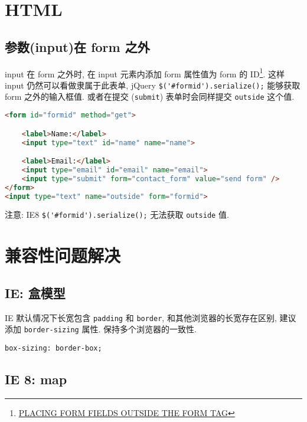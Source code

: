 \section{HTML}\label{html}

\subsection{参数(input)在 form
之外}\label{ux53c2ux6570inputux5728-form-ux4e4bux5916}

input 在 form 之外时, 在 input 元素内添加 form 属性值为 form 的
ID\footnote{\href{http://www.dreamdealer.nl/articles/form_fields_outside_a_form.html}{PLACING
  FORM FIELDS OUTSIDE THE FORM TAG}}. 这样 input
仍然可以看做隶属于此表单, jQuery \lstinline!$('#formid').serialize();!
能够获取 form 之外的输入框值. 或者在提交 (\lstinline!submit!)
表单时会同样提交 \lstinline!outside! 这个值.

\begin{lstlisting}[language=HTML]
<form id="formid" method="get">

    <label>Name:</label>
    <input type="text" id="name" name="name">

    <label>Email:</label>
    <input type="email" id="email" name="email">
    <input type="submit" form="contact_form" value="send form" />
</form>
<input type="text" name="outside" form="formid">
\end{lstlisting}

注意: IE8 \lstinline!$('#formid').serialize();! 无法获取
\lstinline!outside! 值.

\section{兼容性问题解决}\label{ux517cux5bb9ux6027ux95eeux9898ux89e3ux51b3}

\subsection{IE: 盒模型}\label{ie-ux76d2ux6a21ux578b}

IE 默认情况下长宽包含 \lstinline!padding! 和 \lstinline!border!,
和其他浏览器的长宽存在区别, 建议添加 \lstinline!border-sizing! 属性.
保持多个浏览器的一致性.

\begin{lstlisting}
box-sizing: border-box;
\end{lstlisting}

\subsection{IE 8: map}\label{ie-8-map}

